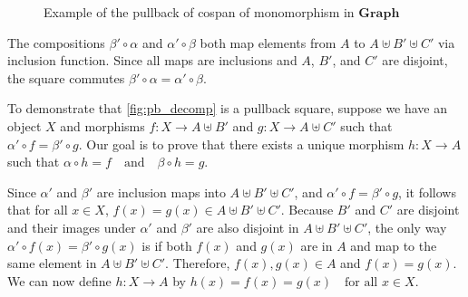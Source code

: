 \begin{example}
\begin{figure}[H]
\begin{center}
{
    }
\end{center}
\caption{Example of the pullback of cospan of monomorphism in \(\mathbf{Graph}\)}
\label{fig:ex:pb_in_graph}
\end{figure}
\end{example}

The compositions \( \beta' \circ \alpha \) and \( \alpha' \circ \beta \) both map elements from \( A \) to \( A \uplus B' \uplus C' \) via inclusion function.
Since all maps are inclusions and \( A \), \( B' \), and \( C' \) are disjoint, the square commutes $
     \beta' \circ \alpha = \alpha' \circ \beta 
$. 

To demonstrate that \autoref{fig:pb_decomp} is a pullback square, suppose we have an object \( X \) and morphisms \( f: X \to A \uplus B' \) and \( g: X \to A \uplus C' \) such that
$
\alpha' \circ f = \beta' \circ g.
$
Our goal is to prove that there exists a unique morphism \( h: X \to A \) such that
$
\alpha \circ h = f \quad \text{and} \quad \beta \circ h = g.
$

Since \( \alpha' \) and \( \beta' \) are inclusion maps into \( A \uplus B' \uplus C' \), and \( \alpha' \circ f = \beta' \circ g \), it follows that for all \( x \in X \),
$
f(x) = g(x) \in A \uplus B' \uplus C'.
$
Because \( B' \) and \( C' \) are disjoint and their images under \( \alpha' \) and \( \beta' \) are also disjoint in \( A \uplus B' \uplus C' \), the only way \( \alpha' \circ f(x) = \beta' \circ g(x) \) is if both \( f(x) \) and \( g(x) \) are in \( A \) and map to the same element in \( A \uplus B' \uplus C' \).
Therefore, \( f(x), g(x) \in A \) and \( f(x) = g(x) \).
We can now define \( h: X \to A \) by
$
h(x) = f(x) = g(x) \quad \text{for all } x \in X.
$


